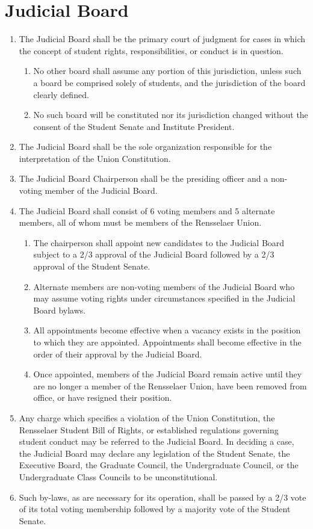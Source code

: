\documentclass{uniondoc}
\begin{document}
\section{Judicial Board}

\begin{enumerate}
\item The Judicial Board shall be the primary court of judgment for cases in which the concept of student rights, responsibilities, or conduct is in question.
  \begin{enumerate}
  \item No other board shall assume any portion of this jurisdiction, unless such a board be comprised solely of students, and the jurisdiction of the board clearly defined.
  \item No such board will be constituted nor its jurisdiction changed without the consent of the Student Senate and Institute President.
  \end{enumerate}
\item The Judicial Board shall be the sole organization responsible for the interpretation of the Union Constitution.
\item The Judicial Board Chairperson shall be the presiding officer and a non-voting member of the Judicial Board.
\item The Judicial Board shall consist of 6 voting members and 5 alternate members, all of whom must be members of the Rensselaer Union.
  \begin{enumerate}
  \item The chairperson shall appoint new candidates to the Judicial Board subject to a 2/3 approval of the Judicial Board followed by a 2/3 approval of the Student Senate.
  \item Alternate members are non-voting members of the Judicial Board who may assume voting rights under circumstances specified in the Judicial Board bylaws.
  \item All appointments become effective when a vacancy exists in the position to which they are appointed. Appointments shall become effective in the order of their approval by the Judicial Board.
  \item Once appointed, members of the Judicial Board remain active until they are no longer a member of the Rensselaer Union, have been removed from office, or have resigned their position.
  \end{enumerate}
\item Any charge which specifies a violation of the Union Constitution, the Rensselaer Student Bill of Rights, or established regulations governing student conduct may be referred to the Judicial Board. In deciding a case, the Judicial Board may declare any legislation of the Student Senate, the Executive Board, the Graduate Council, the Undergraduate Council, or the Undergraduate Class Councils to be unconstitutional.
\item Such by-laws, as are necessary for its operation, shall be passed by a 2/3 vote of its total voting membership followed by a majority vote of the Student Senate.
\end{enumerate}
\end{document}
